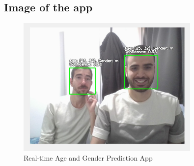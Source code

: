 \documentclass{article}
\begin{document}
\subsection{Image of the app}
\begin{figure}[htbp]
    \centering
    \includegraphics[width=0.8\textwidth]{assets/app.jpg}
    \caption{Real-time Age and Gender Prediction App}
    \label{fig:app}
\end{figure}


 
\end{document}
